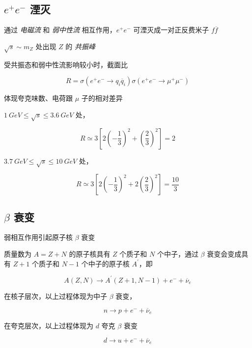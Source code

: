 \documentclass[oneside,a4paper,openany,11pt]{ctexbook}
\begin{document}
\subsection{$e^+e^-$ 湮灭}

通过 \emph{电磁流} 和 \emph{弱中性流} 相互作用，$e^+ e^-$ 可湮灭成一对正反费米子 $f \overline{f}$

$\sqrt{s} \sim m_Z$ 处出现 $Z$ 的 \emph{共振峰}

受共振态和弱中性流影响较小时，截面比

\begin{equation}
    R = \sigma(e^+ e^- \to q_i \overline{q}_i ) \sigma(e^+ e^- \to \mu^+ \mu^-)
\end{equation}

体现夸克味数、电荷跟 $\mu$ 子的相对差异

$1\ GeV \le \sqrt{s} \le 3.6\ GeV$ 处，

\begin{equation}
    R \simeq 3 \left[2  \left(-\frac{1}{3}\right)^2 +  \left(\frac{2}{3}\right)^2 \right] = 2
\end{equation}

$3.7\ GeV \le \sqrt{s} \le 10\ GeV$ 处，

\begin{equation}
    R \simeq 3 \left[2 \left(-\frac{1}{3}\right)^2 +  2 \left(\frac{2}{3}\right)^2 \right] = \frac{10}{3}
\end{equation}

\subsection{$\beta$ 衰变}

弱相互作用引起原子核 $\beta$ 衰变

质量数为 $A=Z+N$ 的原子核具有 $Z$ 个质子和 $N$ 个中子，通过 $\beta$ 衰变会变成具有 $Z+1$ 个质子和 $N-1$ 个中子的原子核 $A^\prime$，即

\begin{equation}
    A(Z, N) \to A^\prime(Z+1, N-1) + e^- + \overline{\nu}_e
\end{equation}

在核子层次，以上过程体现为中子 $\beta$ 衰变，

\begin{equation}
    n \to p + e^- + \overline{\nu}_e
\end{equation}

在夸克层次，以上过程体现为 $d$ 夸克 $\beta$ 衰变

\begin{equation}
    d \to u + e^- + \overline{\nu}_e
\end{equation}
\end{document}
